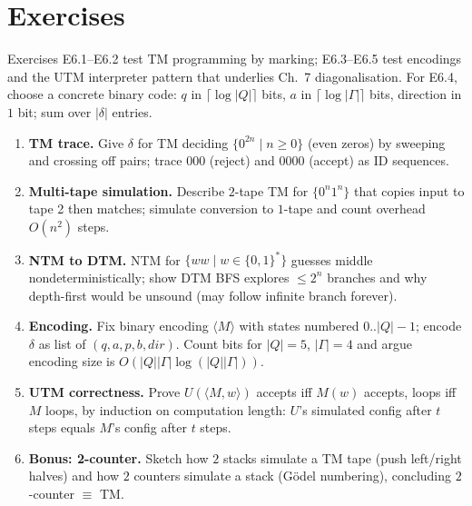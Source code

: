 \section{Exercises}
\label{sec:ch06-exercises}
Exercises E6.1--E6.2 test TM programming by marking; E6.3--E6.5 test encodings and the UTM interpreter pattern that underlies Ch.~7 diagonalisation.
For E6.4, choose a concrete binary code: $q$ in $\lceil\log|Q|\rceil$ bits, $a$ in $\lceil\log|\Gamma|\rceil$ bits, direction in $1$ bit; sum over $|\delta|$ entries.
\begin{enumerate}[label=E6.\arabic*, leftmargin=*, itemsep=0.8em]
\item \textbf{TM trace.} Give $\delta$ for TM deciding $\{0^{2n}\mid n\ge0\}$ (even zeros) by sweeping and crossing off pairs; trace $000$ (reject) and $0000$ (accept) as ID sequences.
\item \textbf{Multi-tape simulation.} Describe $2$-tape TM for $\{0^n1^n\}$ that copies input to tape 2 then matches; simulate conversion to $1$-tape and count overhead $O(n^2)$ steps.
\item \textbf{NTM to DTM.} NTM for $\{ww\mid w\in\{0,1\}^*\}$ guesses middle nondeterministically; show DTM BFS explores $\le2^n$ branches and why depth-first would be unsound (may follow infinite branch forever).
\item \textbf{Encoding.} Fix binary encoding $\langle M\rangle$ with states numbered $0..|Q|-1$; encode $\delta$ as list of $(q,a,p,b,dir)$. Count bits for $|Q|=5$, $|\Gamma|=4$ and argue encoding size is $O(|Q||\Gamma|\log(|Q||\Gamma|))$.
\item \textbf{UTM correctness.} Prove $U(\langle M,w\rangle)$ accepts iff $M(w)$ accepts, loops iff $M$ loops, by induction on computation length: $U$'s simulated config after $t$ steps equals $M$'s config after $t$ steps.
\item \textbf{Bonus: 2-counter.} Sketch how $2$ stacks simulate a TM tape (push left/right halves) and how $2$ counters simulate a stack (G\"odel numbering), concluding $2$-counter $\equiv$ TM.
\end{enumerate}
